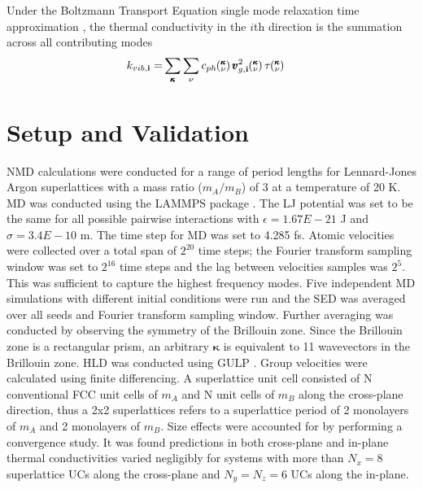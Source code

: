 

Under the Boltzmann Transport Equation single mode relaxation time approximation \cite{ziman_electrons_2001}, the thermal conductivity in the $i$th direction is the summation across all contributing modes
\begin{equation}\label{EQ:M:conductivity}
\begin{split}
k_{vib,\mathbf{i}}=&\sum_{\pmb{\kappa}} \sum_\nu c_{ph}\kv 
\pmb{v}^{2}_{g,\mathbf{i}}\kv \tau\kv
\end{split}
\end{equation}


\section{Setup and Validation}

NMD calculations were conducted for a range of period lengths for Lennard-Jones Argon superlattices with a mass ratio ($m_A/m_B$) of 3 at a temperature of 20 K. MD was conducted using the LAMMPS package \cite{LAMMPS}. The LJ potential was set to be the same for all possible pairwise interactions with $\epsilon= 1.67E-21$ J and $\sigma= 3.4E-10$ m. The time step for MD was set to 4.285 fs. Atomic velocities were collected over a total span of $2^{20}$ time steps; the Fourier transform sampling window was set to $2^{16}$ time steps and the lag between velocities samples was $2^5$. This was sufficient to capture the highest frequency modes. Five independent MD simulations with different initial conditions were run and the SED was averaged over all seeds and Fourier transform sampling window. Further averaging was conducted by observing the symmetry of the Brillouin zone. Since the Brillouin zone is a rectangular prism, an arbitrary $\pmb{\kappa}$ is equivalent to 11 wavevectors in the Brillouin zone. HLD was conducted using GULP \cite{GULP}. Group velocities were calculated using finite differencing. A superlattice unit cell consisted of N conventional FCC unit cells of $m_A$ and N unit cells of $m_B$ along the cross-plane direction, thus a 2x2 superlattices refers to a superlattice period of 2 monolayers of $m_A$ and 2 monolayers of $m_B$. Size effects were accounted for by performing a convergence study. It was found predictions in both cross-plane and in-plane thermal conductivities varied negligibly for systems with more than $N_x=8$ superlattice UCs along the cross-plane and $N_y=N_z=6$ UCs along the in-plane.

